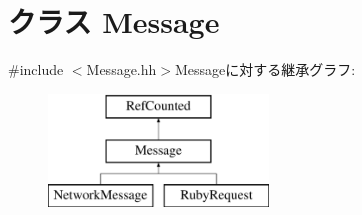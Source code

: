 \hypertarget{classMessage}{
\section{クラス Message}
\label{classMessage}
}


{\ttfamily \#include $<$Message.hh$>$}Messageに対する継承グラフ:\begin{figure}[H]
\begin{center}
\leavevmode
\includegraphics[height=3cm]{classMessage}
\end{center}
\end{figure}
